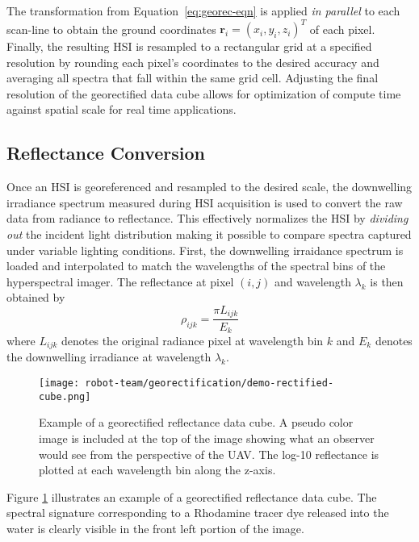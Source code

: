 The transformation from Equation~\ref{eq:georec-eqn} is applied \textit{in parallel}
to each scan-line to obtain the ground coordinates $\mathbf{r}_i=(x_i,
y_i,z_i)^T$ of each pixel. Finally, the resulting HSI is resampled to a
rectangular grid at a specified resolution by rounding each pixel's
coordinates to the desired accuracy and averaging all spectra that fall within the
same grid cell. Adjusting the final resolution of the georectified data cube
allows for optimization of compute time against spatial scale for real time
applications.

\subsection{Reflectance Conversion}

Once an HSI is georeferenced and resampled to the desired scale,
the downwelling irradiance spectrum measured during HSI acquisition is used to
convert the raw data from radiance to reflectance. This effectively normalizes
the HSI by \textit{dividing out} the incident light distribution making it possible
to compare spectra captured under variable lighting conditions. First,
the downwelling irraidance spectrum is loaded and interpolated to match the
wavelengths of the spectral bins of the hyperspectral imager. The reflectance at
pixel $(i,j)$ and wavelength $\lambda_k$ is then obtained by
\begin{equation}
  \rho_{ijk} = \frac{\pi L_{ijk}}{E_k}
\end{equation}
where $L_{ijk}$ denotes the original radiance pixel at wavelength bin $k$ and
$E_k$ denotes the downwelling irradiance at wavelength $\lambda_k$.

\begin{figure}[h]
  \vspace{-2cm}
  \centering
  \texttt{[image: robot-team/georectification/demo-rectified-cube.png]}
  \vspace{-1cm}
  \caption{Example of a georectified reflectance data cube. A pseudo color image is
    included at the top of the image showing what an observer would see from the
    perspective of the UAV. The log-10 reflectance is plotted at each wavelength
    bin along the z-axis. }
  \label{fig:sample-cube}
\end{figure}

Figure \ref{fig:sample-cube} illustrates an example of a georectified
reflectance data cube. The spectral signature corresponding to
a Rhodamine tracer dye released into the water is clearly visible in the front
left portion of the image.

